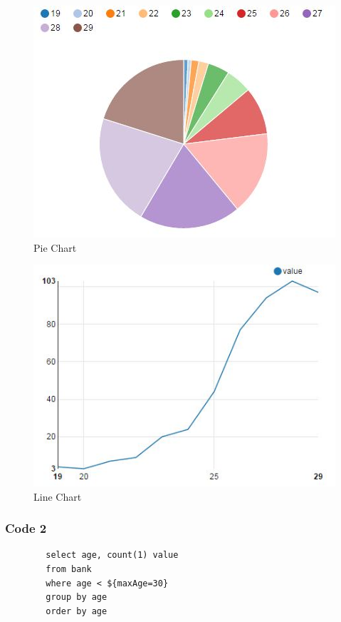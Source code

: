 \documentclass[9pt,twocolumn,twoside]{../../styles/osajnl}
\begin{document}
	\begin{figure}
		\includegraphics[width=\linewidth]{./images/code1_2}
		\caption{Pie Chart}
		\label{fig:Histogram}
	\end{figure}
	
	\begin{figure}
		\includegraphics[width=\linewidth]{./images/code1_4}
		\caption{Line Chart}
		\label{fig:Histogram}
	\end{figure}	
	
	\subsubsection{Code 2}
	
	\begin{verbatim}
		select age, count(1) value 
		from bank 
		where age < ${maxAge=30} 
		group by age 
		order by age
	\end{verbatim}
	
\end{document}
